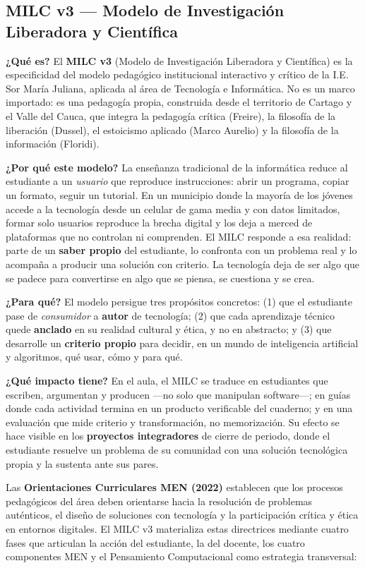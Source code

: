 \documentclass[12pt, a4paper]{article}
\begin{document}
\subsection{MILC v3 — Modelo de Investigación Liberadora y Científica}

\textbf{¿Qué es?} El \textbf{MILC v3} (Modelo de Investigación Liberadora y
Científica) es la especificidad del modelo pedagógico institucional interactivo
y crítico de la I.E. Sor María Juliana, aplicada al área de Tecnología e
Informática. No es un marco importado: es una pedagogía propia, construida desde
el territorio de Cartago y el Valle del Cauca, que integra la pedagogía crítica
(Freire), la filosofía de la liberación (Dussel), el estoicismo aplicado
(Marco Aurelio) y la filosofía de la información (Floridi).

\textbf{¿Por qué este modelo?} La enseñanza tradicional de la informática reduce
al estudiante a un \textit{usuario} que reproduce instrucciones: abrir un
programa, copiar un formato, seguir un tutorial. En un municipio donde la mayoría
de los jóvenes accede a la tecnología desde un celular de gama media y con datos
limitados, formar solo usuarios reproduce la brecha digital y los deja a merced
de plataformas que no controlan ni comprenden. El MILC responde a esa realidad:
parte de un \textbf{saber propio} del estudiante, lo confronta con un problema
real y lo acompaña a producir una solución con criterio. La tecnología deja de
ser algo que se padece para convertirse en algo que se piensa, se cuestiona y
se crea.

\textbf{¿Para qué?} El modelo persigue tres propósitos concretos: (1) que el
estudiante pase de \textit{consumidor} a \textbf{autor} de tecnología; (2) que
cada aprendizaje técnico quede \textbf{anclado} en su realidad cultural y ética,
y no en abstracto; y (3) que desarrolle un \textbf{criterio propio} para decidir,
en un mundo de inteligencia artificial y algoritmos, qué usar, cómo y para qué.

\textbf{¿Qué impacto tiene?} En el aula, el MILC se traduce en estudiantes que
escriben, argumentan y producen —no solo que manipulan software—; en guías donde
cada actividad termina en un producto verificable del cuaderno; y en una
evaluación que mide criterio y transformación, no memorización. Su efecto se
hace visible en los \textbf{proyectos integradores} de cierre de periodo, donde
el estudiante resuelve un problema de su comunidad con una solución tecnológica
propia y la sustenta ante sus pares.

Las \textbf{Orientaciones Curriculares MEN (2022)} establecen que los procesos
pedagógicos del área deben orientarse hacia la resolución de problemas
auténticos, el diseño de soluciones con tecnología y la participación crítica y
ética en entornos digitales. El MILC v3 materializa estas directrices mediante
cuatro fases que articulan la acción del estudiante, la del docente, los cuatro
componentes MEN y el Pensamiento Computacional como estrategia transversal:
\end{document}
